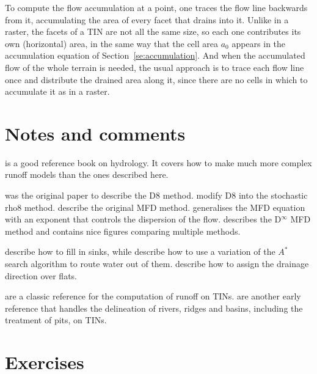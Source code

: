 To compute the flow accumulation at a point, one traces the flow line backwards from it, accumulating the area of every facet that drains into it.
Unlike in a raster, the facets of a TIN are not all the same size, so each one contributes its own (horizontal) area, in the same way that the cell area \(a_0\) appears in the accumulation equation of Section~\ref{se:accumulation}.
And when the accumulated flow of the whole terrain is needed, the usual approach is to trace each flow line once and distribute the drained area along it, since there are no cells in which to accumulate it as in a raster.

%
\section{Notes and comments}

\citet{Beven12} is a good reference book on hydrology.
It covers how to make much more complex runoff models than the ones described here.

\citet{OCallaghan84} was the original paper to describe the D8 method.
\citet{Fairfield91} modify D8 into the stochastic rho8 method.
\citet{Quinn91} describe the original MFD method.
\citet{Holmgren94} generalises the MFD equation with an exponent that controls the dispersion of the flow.
\citet{Tarboton97} describes the D\(^{\infty}\) MFD method and contains nice figures comparing multiple methods.

\citet{Barnes14a} describe how to fill in sinks, while \citet{Metz11} describe how to use a variation of the \(A^{*}\) search algorithm to route water out of them.
\citet{Barnes14} describe how to assign the drainage direction over flats.

\citet{Jones90} are a classic reference for the computation of runoff on TINs.
\citet{Palacios86} are another early reference that handles the delineation of rivers, ridges and basins, including the treatment of pits, on TINs.

%
\section{Exercises}

